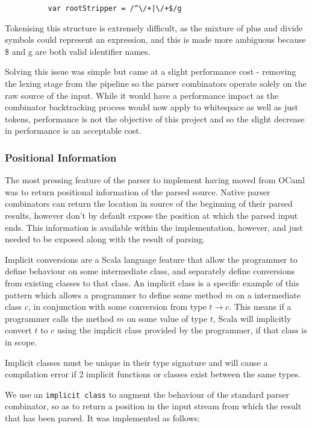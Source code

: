 \documentclass[british, twoside]{bhamthesis}
\theoremstyle{definition}
\begin{document}
        \begin{lstlisting}
          var rootStripper = /^\/+|\/+$/g
        \end{lstlisting}

        Tokenising this structure is extremely difficult, as the mixture of plus and divide symbols could represent an expression, and this is made more ambiguous because \$ and g are both valid identifier names.

        Solving this issue was simple but came at a slight performance cost - removing the lexing stage from the pipeline so the parser combinators operate solely on the raw source of the input. While it would have a performance impact as the combinator backtracking process would now apply to whitespace as well as just tokens, performance is not the objective of this project and so the slight decrease in performance is an acceptable cost.

      \subsubsection{Positional Information}
        The most pressing feature of the parser to implement having moved from OCaml was to return positional information of the parsed source. Native parser combinators can return the location in source of the beginning of their parsed results, however don't by default expose the position at which the parsed input ends. This information is available within the implementation, however, and just needed to be exposed along with the result of parsing.

         Implicit conversions are a Scala language feature that allow the programmer to define behaviour on some intermediate class, and separately define conversions from existing classes to that class. An implicit class is a specific example of this pattern which allows a programmer to define some method $m$ on a intermediate class $c$, in conjunction with some conversion from type $t\rightarrow c$. This means if a programmer calls the method $m$ on some value of type $t$, Scala will implicitly convert $t$ to $c$ using the implicit class provided by the programmer, if that class is in scope.

        Implicit classes must be unique in their type signature and will cause a compilation error if 2 implicit functions or classes exist between the same types.

        We use an \texttt{implicit class} to augment the behaviour of the standard parser combinator, so as to return a position in the input stream from which the result that has been parsed. It was implemented as follows:
\end{document}
